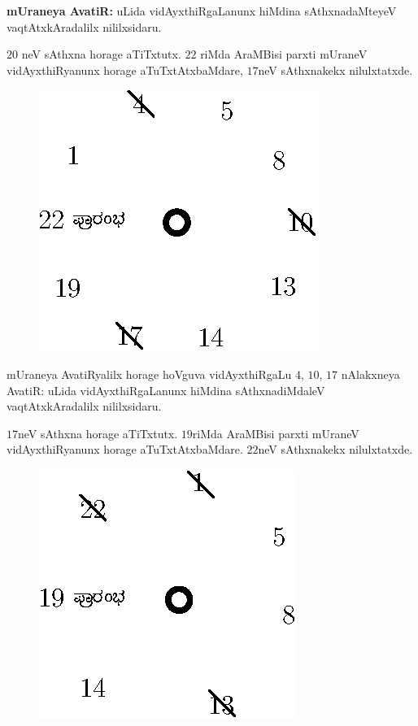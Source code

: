 {\bf mUraneya AvatiR:} uLida vidAyxthiRgaLanunx hiMdina sAthxnadaMteyeV vaqtAtxkAradalilx nililxsidaru.

$20$ neV sAthxna horage aTiTxtutx. $22$ riMda AraMBisi parxti mUraneV vidAyxthiRyanunx horage aTuTxtAtxbaMdare, $17$neV sAthxnakekx nilulxtatxde. 
\begin{figure}[H]
\centering
\includegraphics[scale=0.8]{src/figures/fig11.eps}
\end{figure}

mUraneya AvatiRyalilx horage hoVguva vidAyxthiRgaLu $4$, $10$, $17$ nAlakxneya AvatiR: uLida vidAyxthiRgaLanunx hiMdina sAthxnadiMdaleV vaqtAtxkAradalilx nililxsidaru.

$17$neV sAthxna horage aTiTxtutx. $19$riMda AraMBisi parxti mUraneV vidAyxthiRyanunx horage aTuTxtAtxbaMdare. $22$neV sAthxnakekx nilulxtatxde. 

\medskip

\begin{figure}[H]
\centering
\includegraphics[scale=0.8]{src/figures/fig12.eps}
\end{figure}

